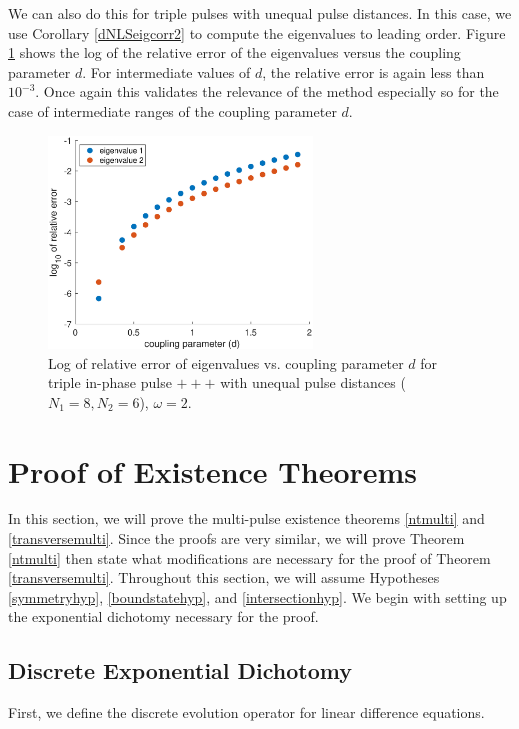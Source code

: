 \documentclass[12pt]{article}
\begin{document}
We can also do this for triple pulses with unequal pulse distances. In this case, we use Corollary \ref{dNLSeigcorr2} to compute the eigenvalues to leading order. Figure \ref{fig:error2} shows the log of the relative error of the eigenvalues versus the coupling parameter $d$.
For intermediate values of $d$, the relative error is again less than $10^{-3}$. Once again this validates the relevance
of the method especially so for the case of 
intermediate ranges of the coupling parameter $d$.

\begin{figure}[H]
\centering
\includegraphics[width=7cm]{errors3.eps}
\caption{Log of relative error of eigenvalues vs. coupling parameter $d$ for triple in-phase pulse $+++$ with unequal pulse distances ($N_1 = 8, N_2 = 6$), $\omega = 2$.}
\label{fig:error2}
\end{figure}

\section{Proof of Existence Theorems}

In this section, we will prove the multi-pulse existence theorems \ref{ntmulti} and \ref{transversemulti}. Since the proofs are very similar, we will prove Theorem \ref{ntmulti} then state what modifications are necessary for the proof of Theorem \ref{transversemulti}. Throughout this section, we will assume Hypotheses \ref{symmetryhyp}, \ref{boundstatehyp}, and \ref{intersectionhyp}. We begin with setting up the exponential dichotomy necessary for the proof.

\subsection{Discrete Exponential Dichotomy}

First, we define the discrete evolution operator for linear difference equations.
\end{document}
